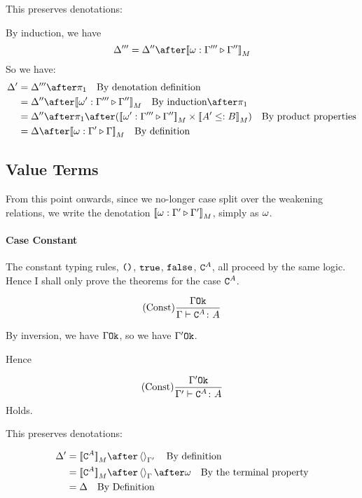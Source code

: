 \documentclass{report}
\begin{document}
    This preserves denotations:

    By induction, we have
    \begin{equation}
        \D''' = \D'' \after \deno{\wrel{\w}{\G'''}{\G''}}
    \end{equation}
    So we have:
    \begin{align}
        \D' &= \D''' \after \p\qt{By denotation definition}\\
        & = \D''\after\deno{\wrel{\w'}{\G'''}{\G''}}\qt{By induction}\after\p \\
        & = \D''\after\p\after(\deno{\wrel{\w'}{\G'''}{\G''}}\times\deno{A' \subtype B})\qt{By product properties}\\
        & = \D\after\deno{\wrel{\w}{\G'}{\G}}\qt{By definition}
    \end{align}

\subsection{Value Terms}
From this point onwards, since we no-longer case split over the weakening relations, we write the denotation ${\bf [\![}\omega : \Gamma' \triangleright \Gamma'{\bf ]\!]}_M$, simply as $\omega$.


\paragraph{Case Constant}
The constant typing rules, $\texttt{()}$, $\texttt{true}$, $\texttt{false}$, $\texttt{C}^{A}$, all proceed by the same logic. Hence I shall only prove the theorems for the case $\texttt{C}^{A}$.

\begin{equation}
    (\text{Const}) \frac{\Gamma \texttt{Ok}}{\Gamma \vdash \texttt{C}^{A} \colon A}
\end{equation}

By inversion, we have $\Gamma \texttt{Ok}$, so we have $\Gamma' \texttt{Ok}$.

Hence

\begin{equation}
    (\text{Const}) \frac{\Gamma' \texttt{Ok}}{\Gamma' \vdash \texttt{C}^{A} \colon A}
\end{equation}
Holds.

This preserves denotations:


\begin{align}
    \D' & = \deno{\const{A}} \after \term{\G'}\qt{By definition}\\
    & = \deno{\const{A}} \after \term{\G}\after \w \qt{By the terminal property}\\
    & = \D\qt{By Definition}\\
\end{align}
\end{document}
